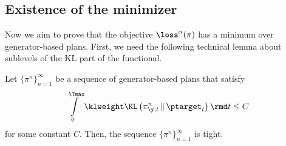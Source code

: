\subsection{Existence of the minimizer}
\label{subsec:inf}
Now we aim to prove that the objective $\loss^\alpha(\pi)$ has a minimum over generator-based plans. 
First, we need the following technical lemma about sublevels of the KL part of the functional.
\begin{lemma}
\label{lemma:tightness}
    Let $\{\pi^{n}\}_{n = 1}^{\infty}$ be a sequence of generator-based plans that satisfy 
    \begin{equation}
        \int\limits_{0}^{\Tmax} \klweight \textup{\KL}\left(\pi^n_{\y, t} \,\|\, \ptarget_t \right) \rmd t \leq C
    \end{equation}
    for some constant $C$. Then, the sequence $\{\pi^n\}_{n = 1}^{\infty}$ is tight.
\end{lemma}
